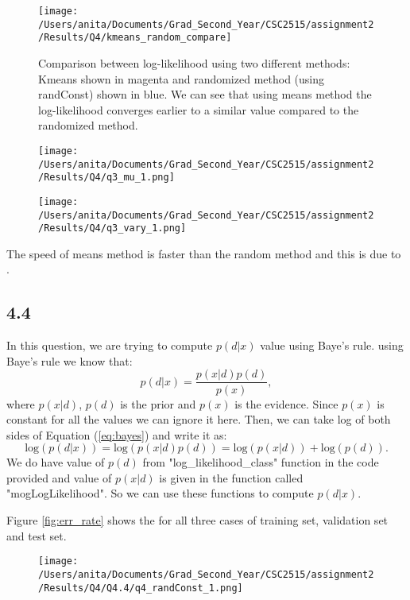\documentclass[10pt]{article}
\begin{document}
\begin{figure}[H]
	\centering
	\texttt{[image: /Users/anita/Documents/Grad\_Second\_Year/CSC2515/assignment2/Results/Q4/kmeans\_random\_compare]}
	\caption{Comparison between log-likelihood using two different methods: Kmeans shown in magenta and randomized method (using randConst) shown in blue.
	We can see that using means method the log-likelihood converges earlier to a similar value compared to the randomized method.}
	\label{fig:q4.3_logL}
\end{figure}


\begin{figure}[H]
	\centering
	\texttt{[image: /Users/anita/Documents/Grad\_Second\_Year/CSC2515/assignment2/Results/Q4/q3\_mu\_1.png]}
	\caption{}
	\label{fig:q4.3_mu}
\end{figure}


\begin{figure}[H]
	\centering
	\texttt{[image: /Users/anita/Documents/Grad\_Second\_Year/CSC2515/assignment2/Results/Q4/q3\_vary\_1.png]}
	\caption{}
	\label{fig:q4.3_mu}
\end{figure}

The speed of means method is faster than the random method and this is due to .

\subsection*{4.4}
In this question, we are trying to compute $p(d|x)$ value using Baye's rule. using Baye's rule we know that:
\begin{equation}\label{eq:bayes}
p(d|x) = \frac{p(x|d) p(d)}{p(x)},
\end{equation}
where $p(x|d)$, $p(d)$ is the prior and $p(x)$ is the evidence. Since $p(x)$ is constant for all the values we can ignore it here. Then, we can take log of both sides of Equation (\ref{eq:bayes}) and write it as:
\begin{equation}
\mathrm{log} (p(d|x)) = \mathrm{log}(p(x|d) p(d)) = \mathrm{log}(p(x|d)) + \mathrm{log}(p(d)).
\end{equation} 
We do have value of $p(d)$ from "log\_likelihood\_class" function in the code provided and value of $p(x|d)$ is given in the function called "mogLogLikelihood". So we can use these functions to compute $p(d|x)$.

Figure \ref{fig:err_rate} shows the for all three cases of training set, validation set and test set.
\begin{figure}[H]
	\centering
	\texttt{[image: /Users/anita/Documents/Grad\_Second\_Year/CSC2515/assignment2/Results/Q4/Q4.4/q4\_randConst\_1.png]}
	\caption{}
	\label{fig:4.4}
\end{figure}
\end{document}
